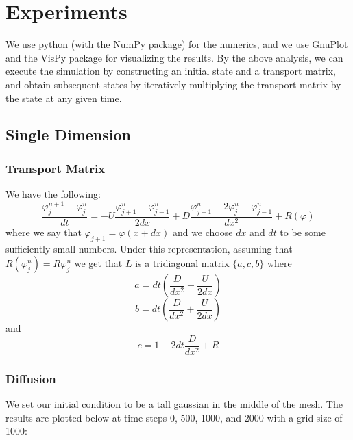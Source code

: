 \documentclass[12pt]{article}
\begin{document}

\section{Experiments}

We use python (with the NumPy package) for the numerics, and we use GnuPlot and the VisPy package for visualizing the results. By the above analysis, we can execute the simulation by constructing an initial state and a transport matrix, and obtain subsequent states by iteratively multiplying the transport matrix by the state at any given time.

\subsection{Single Dimension}
\subsubsection{Transport Matrix}
We have the following:
\[\frac{\varphi^{n+1}_j - \varphi^n_j}{dt} = -U\frac{\varphi^n_{j+1} - \varphi^n_{j-1}}{2dx} + D\frac{\varphi^n_{j+1} - 2\varphi^n_j + \varphi^n_{j-1}}{dx^2} + R(\varphi)\]
where we say that $\varphi_{j+1} = \varphi(x + dx)$ and we choose $dx$ and $dt$ to be some sufficiently small numbers. Under this representation, assuming that $R(\varphi^n_j) = R\varphi^n_j$ we get that $L$ is a tridiagonal matrix $\{a, c, b\}$ where 
\[a = dt\left(\frac{D}{dx^2}-\frac{U}{2dx}\right)\]
\[b = dt\left(\frac{D}{dx^2}+\frac{U}{2dx}\right)\]
and 
\[c = 1 - 2dt\frac{D}{dx^2} + R\]
\subsubsection{Diffusion}
We set our initial condition to be a tall gaussian in the middle of the mesh. The results are plotted below at time steps 0, 500, 1000, and 2000 with a grid size of 1000:
\end{document}
